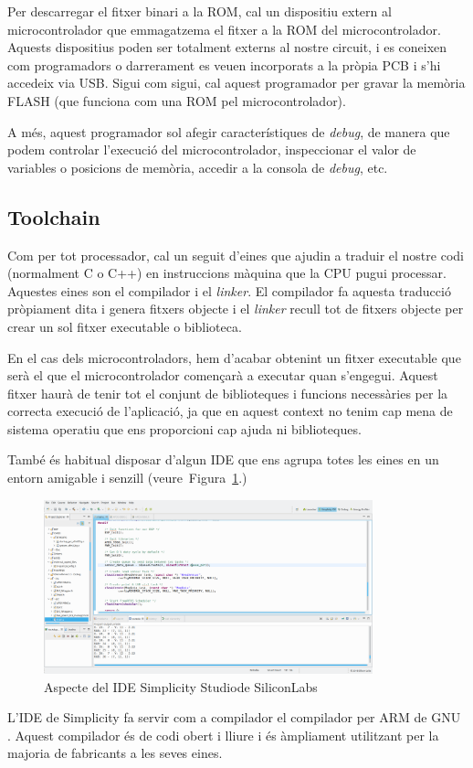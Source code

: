 Per descarregar el fitxer binari a la ROM, cal un dispositiu extern al microcontrolador que emmagatzema el fitxer a la ROM del microcontrolador. Aquests dispositius poden ser totalment externs al nostre circuit, i es coneixen com programadors o darrerament es veuen incorporats a la pròpia \gls{PCB} i s'hi accedeix via USB. Sigui com sigui, cal aquest programador per gravar la memòria FLASH (que funciona com una ROM pel microcontrolador).

A més, aquest programador sol afegir característiques de {\em debug}, de manera que podem controlar l'execució del microcontrolador, inspeccionar el valor de variables o posicions de memòria, accedir a la consola de {\em debug}, etc.

\subsection{Toolchain}
Com per tot processador, cal un seguit d'eines que ajudin a traduir el nostre codi (normalment C o C++) en instruccions màquina que la CPU pugui processar. Aquestes eines son el compilador i el {\em linker}. El compilador fa aquesta traducció pròpiament dita i genera fitxers objecte i el {\em linker} recull tot de fitxers objecte per crear un sol fitxer executable o biblioteca.

En el cas dels microcontroladors, hem d'acabar obtenint un fitxer executable que serà el que el microcontrolador començarà a executar quan s'engegui. Aquest fitxer haurà de tenir tot el conjunt de biblioteques i funcions necessàries per la correcta execució de l'aplicació, ja que en aquest context no tenim cap mena de sistema operatiu que ens proporcioni cap ajuda ni biblioteques.

També és habitual disposar d'algun \gls{IDE} que ens agrupa totes les eines en un entorn amigable i senzill (veure~Figura~\ref{fig:IDE}.)

\begin{figure}
 \centering
 \includegraphics[width=0.85\textwidth, keepaspectratio]{imatges/capturaIDE.png}
 \caption{Aspecte del IDE Simplicity Studio\texttrademark de SiliconLabs}
 \label{fig:IDE}
\end{figure}

L'\gls{IDE} de Simplicity fa servir com a compilador el compilador per ARM de GNU \cite{ARMGNU}. Aquest compilador és de codi obert i lliure i és àmpliament utilitzant per la majoria de fabricants a les seves eines.

